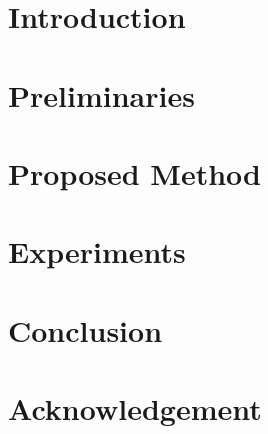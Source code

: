 \documentclass[10pt]{jarticle}
\begin{document}
    

    \maketitle

    \begin{summary}  \end{summary}

    \section{Introduction}      \label{sec:Introduction}    

    \section{Preliminaries}     \label{sec:Preliminaries}   

    \section{Proposed Method}   \label{sec:ProposedMethod}  

    \section{Experiments}       \label{sec:Experiments}     

    \section{Conclusion}        \label{sec:Conclusion}      

    \section*{Acknowledgement}  

    \begin{spacing}{0.88}
        \small
        \setlength{\itemsep}{0pt}
        
        
    \end{spacing}
\end{document}
